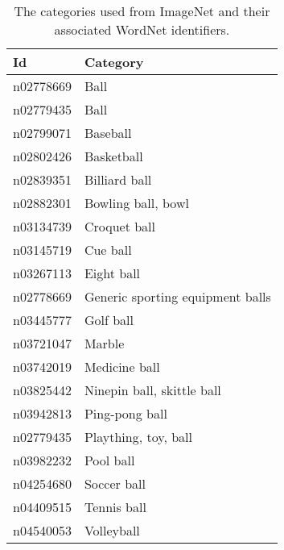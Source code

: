 \documentclass[11pt]{scrartcl}
\begin{document}
{{            \begin{table}
            \centering
            \caption{The categories used from ImageNet and their associated WordNet \citep{fellbaum1998wordnet} identifiers.}
            \label{tab:imagenet}
            \begin{tabularx}{\textwidth}{lX}
                \toprule
                \textbf{Id} & \textbf{Category} \\
                \midrule
                n02778669 & Ball \\
                n02779435 & Ball \\
                n02799071 & Baseball \\
                n02802426 & Basketball \\
                n02839351 & Billiard ball \\
                n02882301 & Bowling ball, bowl \\
                n03134739 & Croquet ball \\
                n03145719 & Cue ball \\
                n03267113 & Eight ball \\
                n02778669 & Generic sporting equipment balls \\
                n03445777 & Golf ball \\
                n03721047 & Marble \\
                n03742019 & Medicine ball \\
                n03825442 & Ninepin ball, skittle ball \\
                n03942813 & Ping-pong ball \\
                n02779435 & Plaything, toy, ball \\
                n03982232 & Pool ball \\
                n04254680 & Soccer ball \\
                n04409515 & Tennis ball \\
                n04540053 & Volleyball \\
                \bottomrule
            \end{tabularx}
            \end{table}

            
}}
\end{document}
